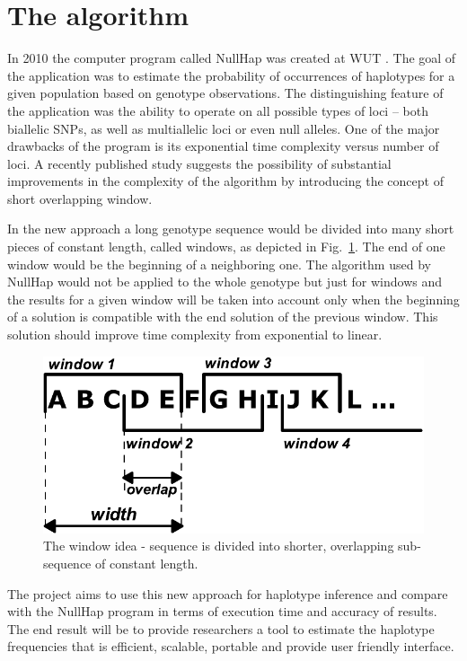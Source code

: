 \documentclass[]{spie}
\begin{document}
\section{The algorithm}

In 2010 the computer program called NullHap was created at WUT \cite{nowak}.
The goal of the application was to estimate the probability of occurrences of haplotypes for a given population based on genotype observations.
The distinguishing feature of the application was the ability to operate on all possible types of loci -- both biallelic SNPs, as well as multiallelic loci or even null alleles.
One of the major drawbacks of the program is its exponential time complexity versus number of loci.
A recently published study \cite{gusev} suggests the possibility of substantial improvements in the complexity of the algorithm by introducing the concept of short overlapping window.

In the new approach a long genotype sequence would be divided into many short pieces of constant length, called windows, as depicted in Fig.~\ref{fig:window}.
The end of one window would be the beginning of a neighboring one.
The algorithm used by NullHap would not be applied to the whole genotype but just for windows and the results for a given window will be taken into account only when the beginning of a solution is compatible with the end solution of the previous window.
This solution should improve time complexity from exponential to linear.

\begin{figure}[!htb]
\centering
\includegraphics[scale=0.7]{images/window}
\caption{The window idea - sequence is divided into shorter, overlapping sub-sequence of constant length.}
\label{fig:window}
\end{figure}


The project aims to use this new approach for haplotype inference and compare with the NullHap program in terms of execution time and accuracy of results.
The end result will be to provide researchers a tool to estimate the haplotype frequencies that is efficient, scalable, portable and provide user friendly interface.
\end{document}
